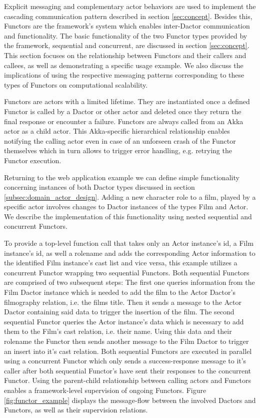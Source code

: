 Explicit messaging and complementary actor behaviors are used to implement the cascading communication pattern described in section \ref{sec:concept}.
Besides this, Functors are the framework's system which enables inter-Dactor communication and functionality.
The basic functionality of the two Functor types provided by the framework, sequential and concurrent, are discussed in section \ref{sec:concept}.
This section focuses on the relationship between Functors and their callers and callees, as well as demonstrating a specific usage example.
We also discuss the implications of using the respective messaging patterns corresponding to these types of Functors on computational scalability.

Functors are actors with a limited lifetime.
They are instantiated once a defined Functor is called by a Dactor or other actor and deleted once they return the final response or encounter a failure.
Functors are always called from an Akka actor as a child actor.
This Akka-specific hierarchical relationship enables notifying the calling actor even in case of an unforseen crash of the Functor themselves which in turn allows to trigger error handling, e.g. retrying the Functor execution.

Returning to the web application example we can define simple functionality concerning instances of both Dactor types discussed in section \ref{subsec:domain_actor_design}.
Adding a new character role to a film, played by a specific actor involves changes to Dactor instances of the types Film and Actor.
We describe the implementation of this functionality using nested sequential and concurrent Functors.

To provide a top-level function call that takes only an Actor instance's id, a Film instance's id, as well a rolename and adds the corresponding Actor information to the identified Film instance's cast list and vice versa, this example utilizes a concurrent Functor wrapping two sequential Functors.
Both sequential Functors are comprised of two subsequent steps:
The first one queries information from the Film Dactor instance which is needed to add the film to the Actor Dactor's filmography relation, i.e. the films title.
Then it sends a message to the Actor Dactor containing said data to trigger the insertion of the film.
The second sequential Functor queries the Actor instance's data which is necessary to add them to the Film's cast relation, i.e. their name. Using this data and their rolename the Functor then sends another message to the Film Dactor to trigger an insert into it's cast relation.
Both sequential Functors are executed in parallel using a concurrent Functor which only sends a success-response message to it's caller after both sequential Functor's have sent their responses to the concurrent Functor.
Using the parent-child relationship between calling actors and Functors enables a framework-level supervision of ongoing Functors.
Figure \ref{fig:functor_example} displays the message-flow between the involved Dactors and Functors, as well as their supervision relations.




